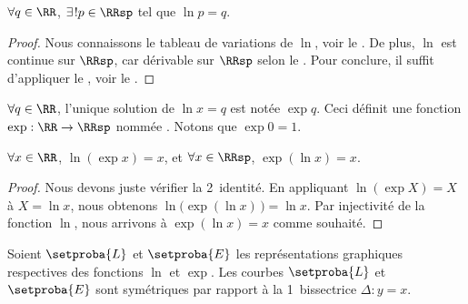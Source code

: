 \begin{fact}
    $\forall q \in \RR$,
    $\exists\kern1pt! p \in \RRsp$ tel que
    $\ln p = q$.
\end{fact}


\begin{proof}
    Nous connaissons le tableau de variations de $\ln$, voir le .
    De plus,
    $\ln$ est continue sur $\RRsp$, car dérivable sur $\RRsp$ selon le .
    Pour conclure,
    il suffit d'appliquer le \tvi, voir le .
\end{proof}




\begin{defi}
    $\forall q \in \RR$,
    l'unique solution de $\ln x = q$ est notée $\exp q$.
    Ceci définit une fonction $\exp: \RR \to \RRsp$ nommée .
    Notons que $\exp 0 = 1$.
\end{defi}




\begin{fact}
    $\forall x \in \RR$, $\ln ( \exp x ) = x$,
    et
    $\forall x \in \RRsp$, $\exp ( \ln x ) = x$.
\end{fact}


\begin{proof}
    Nous devons juste vérifier la 2\ieme\ identité.
    En appliquant $\ln ( \exp X ) = X$ à $X = \ln x$,
    nous obtenons $\ln \big( \exp ( \ln x ) \,\big) = \ln x$.
    Par injectivité de la fonction $\ln$, nous arrivons à $\exp ( \ln x ) = x$ comme souhaité.
\end{proof}




\begin{fact} \label{exp-sym-ln}
    Soient $\setproba{L}$ et $\setproba{E}$ les représentations graphiques respectives des fonctions $\ln$ et $\exp$.
    Les courbes $\setproba{L}$ et $\setproba{E}$ sont symétriques par rapport à la 1\iere\ bissectrice $\Delta: y = x$.
\end{fact}


